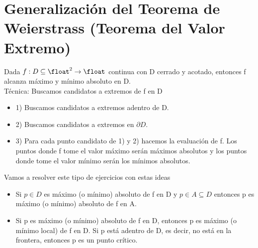 \documentclass[10pt,a4paper]{article}
\begin{document}
\section*{Generalización del Teorema de Weierstrass (Teorema del Valor Extremo)}
Dada $f:D \subseteq \float^{2} \rightarrow \float$ continua con D cerrado y acotado, entonces f alcanza máximo y mínimo absoluto en D. \\
Técnica: Buscamos candidatos a extremos de f en D 
\begin{itemize}
    \item 1) Buscamos candidatos a extremos adentro de D.
    \item 2) Buscamos candidatos a extremos en $\partial D$.
    \item 3) Para cada punto candidato de 1) y 2) hacemos la evaluación de f. Los puntos donde f tome el valor máximo serán máximos absolutos y los puntos donde tome el valor mínimo serán los mínimos absolutos.
\end{itemize}
Vamos a resolver este tipo de ejercicios con estas ideas 
\begin{itemize}
    \item Si $p \in D$ es máximo (o mínimo) absoluto de f en D y $p \in A \subseteq D$ entonces p es máximo (o mínimo) absoluto de f en A.
    \item Si p es máximo (o mínimo) absoluto de f en D, entonces p es máximo (o mínimo local) de f en D. Si p está adentro de D, es decir,  no está en la frontera, entonces p es un punto crítico.
\end{itemize}
\end{document}
